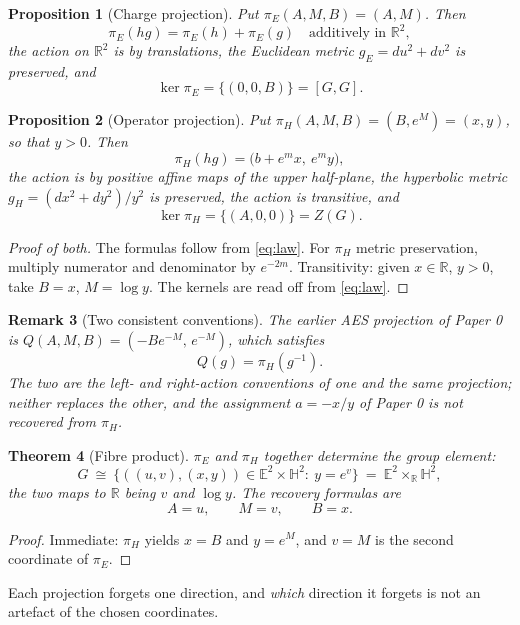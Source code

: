 \documentclass[11pt]{article}
\newtheorem{theorem}{Theorem}[section]
\newtheorem{proposition}[theorem]{Proposition}
\newtheorem{remark}[theorem]{Remark}
\begin{document}
\begin{proposition}[Charge projection]
\label{prop:pi-E}
Put $\pi_E(A,M,B)=(A,M)$. Then
\[
\pi_E(hg)=\pi_E(h)+\pi_E(g)\quad\text{additively in }\mathbb R^2,
\]
the action on $\mathbb R^2$ is by translations, the Euclidean metric
$g_E=du^2+dv^2$ is preserved, and
\[
\ker\pi_E=\{(0,0,B)\}=[G,G].
\]
\end{proposition}

\begin{proposition}[Operator projection]
\label{prop:pi-H}
Put $\pi_H(A,M,B)=(B,e^M)=(x,y)$, so that $y>0$. Then
\[
\pi_H(hg)=\bigl(b+e^m x,\ e^m y\bigr),
\]
the action is by positive affine maps of the upper half-plane, the hyperbolic
metric $g_H=(dx^2+dy^2)/y^2$ is preserved, the action is transitive, and
\[
\ker\pi_H=\{(A,0,0)\}=Z(G).
\]
\end{proposition}

\begin{proof}[Proof of both]
The formulas follow from \eqref{eq:law}. For $\pi_H$ metric preservation,
multiply numerator and denominator by $e^{-2m}$. Transitivity: given $x\in\mathbb
R$, $y>0$, take $B=x$, $M=\log y$. The kernels are read off from
\eqref{eq:law}.
\end{proof}

\begin{remark}[Two consistent conventions]
The earlier AES projection of Paper 0 is
$Q(A,M,B)=(-Be^{-M},\,e^{-M})$, which satisfies
\[
Q(g)=\pi_H(g^{-1}).
\]
The two are the left- and right-action conventions of one and the same
projection; neither replaces the other, and the assignment $a=-x/y$ of Paper 0 is
\emph{not} recovered from $\pi_H$.
\end{remark}

\begin{theorem}[Fibre product]
\label{thm:fibre-product}
$\pi_E$ and $\pi_H$ together determine the group element:
\[
G\ \cong\ \bigl\{((u,v),(x,y))\in\mathbb E^2\times\mathbb H^2:\ y=e^v\bigr\}
\ =\ \mathbb E^2\times_{\mathbb R}\mathbb H^2,
\]
the two maps to $\mathbb R$ being $v$ and $\log y$. The recovery formulas are
\[
A=u,\qquad M=v,\qquad B=x .
\]
\end{theorem}

\begin{proof}
Immediate: $\pi_H$ yields $x=B$ and $y=e^M$, and $v=M$ is the second coordinate
of $\pi_E$.
\end{proof}

Each projection forgets one direction, and \emph{which} direction it forgets is
not an artefact of the chosen coordinates.
\end{document}
